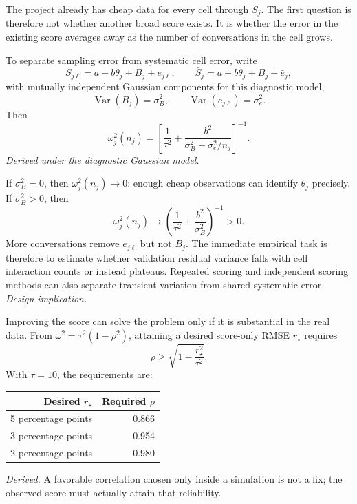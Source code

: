 \documentclass[11pt]{article}
\newcommand{\Var}{\operatorname{Var}}
\begin{document}
The project already has cheap data for every cell through \(S_j\). The first
question is therefore not whether another broad score exists. It is whether
the error in the existing score averages away as the number of conversations
in the cell grows.

To separate sampling error from systematic cell error, write
\begin{equation}
 S_{j\ell}=a+b\theta_j+B_j+e_{j\ell},
 \qquad
 \bar S_j=a+b\theta_j+B_j+\bar e_j,
 \label{eq:repeated-score-model}
\end{equation}
with mutually independent Gaussian components for this diagnostic model,
\begin{equation}
 \Var(B_j)=\sigma_B^2,
 \qquad
 \Var(e_{j\ell})=\sigma_e^2.
 \label{eq:score-components}
\end{equation}
Then
\begin{equation}
 \omega_j^2(n_j)
 =\left[
 \frac1{\tau^2}
 +\frac{b^2}{\sigma_B^2+\sigma_e^2/n_j}
 \right]^{-1}.
 \label{eq:repeated-score-variance}
\end{equation}
\emph{Derived under the diagnostic Gaussian model.}

If \(\sigma_B^2=0\), then
\(\omega_j^2(n_j)\to0\): enough cheap observations can identify
\(\theta_j\) precisely. If \(\sigma_B^2>0\), then
\begin{equation}
 \omega_j^2(n_j)
 \longrightarrow
 \left(\frac1{\tau^2}+\frac{b^2}{\sigma_B^2}\right)^{-1}>0.
 \label{eq:systematic-floor}
\end{equation}
More conversations remove \(e_{j\ell}\) but not \(B_j\). The immediate
empirical task is therefore to estimate whether validation residual variance
falls with cell interaction counts or instead plateaus. Repeated scoring and
independent scoring methods can also separate transient variation from
shared systematic error. \emph{Design implication.}

Improving the score can solve the problem only if it is substantial in the
real data. From \(\omega^2=\tau^2(1-\rho^2)\), attaining a desired score-only
RMSE \(r_\star\) requires
\begin{equation}
 \rho\geq\sqrt{1-\frac{r_\star^2}{\tau^2}}.
 \label{eq:required-correlation}
\end{equation}
With \(\tau=10\), the requirements are:
\begin{center}
\begin{tabular}{r r}
\hline
Desired \(r_\star\) & Required \(\rho\) \\
\hline
5 percentage points & 0.866 \\
3 percentage points & 0.954 \\
2 percentage points & 0.980 \\
\hline
\end{tabular}
\end{center}
\emph{Derived.} A favorable correlation chosen only inside a simulation is
not a fix; the observed score must actually attain that reliability.
\end{document}
